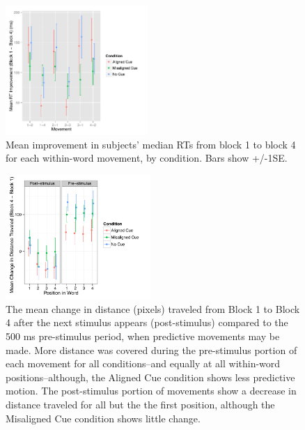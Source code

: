 \documentclass[conference]{IEEEtran}
\begin{document}
\begin{figure}[h]
  \centering
  \includegraphics[width=0.48\textwidth]{figures/exp2_RTimprov_movement_by_cond}
  \caption{Mean improvement in subjects' median RTs from block 1 to block 4 for each within-word movement, by condition. Bars show +/-1SE.}
  \label{fig:exp2move_improv}
\end{figure} 

\begin{figure}[h]
  \centering
  \includegraphics[width=0.49\textwidth]{figures/exp2_change_in_distance_by_position_b1_to_b4} 
  \caption{The mean change in distance (pixels) traveled from Block 1 to Block 4 after the next stimulus appears (post-stimulus) compared to the 500 ms pre-stimulus period, when predictive movements may be made. More distance was covered during the pre-stimulus portion of each movement for all conditions--and equally at all within-word positions--although, the Aligned Cue condition shows less predictive motion. The post-stimulus portion of movements show a decrease in distance traveled for all but the the first position, although the Misaligned Cue condition shows little change.}
  \label{fig:predictive}
\end{figure} 
\end{document}
